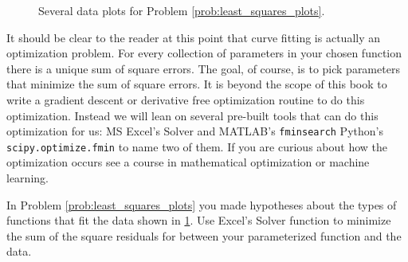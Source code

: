 \begin{figure}
\begin{center}
    \end{center}
    \caption{Several data plots for Problem \ref{prob:least_squares_plots}.}
    \label{fig:plot_least_squares_prob}
\end{figure}

It should be clear to the reader at this point that curve fitting is actually an
optimization problem.  For every collection of parameters in your chosen function there is
a unique sum of square errors.  The goal, of course, is to pick parameters that minimize
the sum of square errors.  It is beyond the scope of this book to write a gradient
descent or derivative free optimization routine to do this optimization.  Instead we will
lean on several pre-built tools that can do this optimization for us: MS Excel's Solver
and 
\ifnum{} MATLAB's \texttt{fminsearch}
\else
Python's \texttt{scipy.optimize.fmin}
\fi
to name two of them.  If you are curious about how the
optimization occurs see a course in mathematical optimization or machine learning.

\begin{problem}
    In Problem \ref{prob:least_squares_plots} you made hypotheses about the types of
    functions that fit the data shown in \ref{fig:plot_least_squares_prob}.  Use Excel's
    Solver function to minimize the sum of the square residuals for between your
    parameterized function and the data.  
\end{problem}

